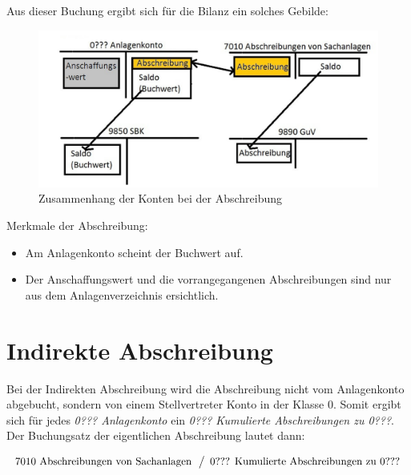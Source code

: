 \documentclass[a4paper,10pt]{report}
\begin{document}
Aus dieser Buchung ergibt sich für die Bilanz ein solches Gebilde:
\begin{figure}[ht]
\centering
\includegraphics[width=12cm]{Bilder/Abschreibung-Konten_der_Bilanz}
\caption{Zusammenhang der Konten bei der Abschreibung}
\end{figure}
\pagebreak

Merkmale der Abschreibung:
\begin{itemize}
  \item Am Anlagenkonto scheint der Buchwert auf.
  \item Der Anschaffungswert und die vorrangegangenen Abschreibungen
sind nur aus dem Anlagenverzeichnis ersichtlich.
\end{itemize}

\section{Indirekte Abschreibung}
\label{sec:indirekteabschreibung}
Bei der Indirekten Abschreibung wird die Abschreibung nicht vom
Anlagenkonto abgebucht, sondern von einem Stellvertreter Konto in der
Klasse 0. Somit ergibt sich für jedes \textit{0??? Anlagenkonto} ein
\textit{0??? Kumulierte Abschreibungen zu 0???}. Der Buchungsatz der
eigentlichen Abschreibung lautet dann:

\begin{equation*}
  \begin{array}{l}
    \text{7010 Abschreibungen von Sachanlagen}\\
  \end{array}
  \left\slash
    \begin{array}{l}
      \text{0??? Kumulierte Abschreibungen zu 0???}\\
    \end{array}
  \right.
\end{equation*}
\end{document}
